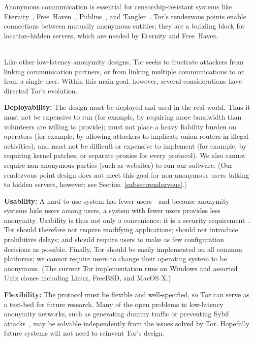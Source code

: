 \documentclass[times,10pt,twocolumn]{article}
\begin{document}
Anonymous communication is essential for censorship-resistant
systems like Eternity~\cite{eternity}, Free~Haven~\cite{freehaven-berk},
Publius~\cite{publius}, and Tangler~\cite{tangler}. Tor's rendezvous
points enable connections between mutually anonymous entities; they
are a building block for location-hidden servers, which are needed by
Eternity and Free~Haven.


\label{sec:assumptions}

\\
Like other low-latency anonymity designs, Tor seeks to frustrate
attackers from linking communication partners, or from linking
multiple communications to or from a single user.  Within this
main goal, however, several considerations have directed
Tor's evolution.

\textbf{Deployability:} The design must be deployed and used in the
real world.  Thus it
must not be expensive to run (for example, by requiring more bandwidth
than volunteers are willing to provide); must not place a heavy
liability burden on operators (for example, by allowing attackers to
implicate onion routers in illegal activities); and must not be
difficult or expensive to implement (for example, by requiring kernel
patches, or separate proxies for every protocol).  We also cannot
require non-anonymous parties (such as websites)
to run our software.  (Our rendezvous point design does not meet
this goal for non-anonymous users talking to hidden servers,
however; see Section~\ref{subsec:rendezvous}.)

\textbf{Usability:} A hard-to-use system has fewer users---and because
anonymity systems hide users among users, a system with fewer users
provides less anonymity.  Usability is thus not only a convenience:
it is a security requirement~\cite{econymics,back01}. Tor should
therefore not
require modifying applications; should not introduce prohibitive delays;
and should require users to make as few configuration decisions
as possible.  Finally, Tor should be easily implemented on all common
platforms; we cannot require users to change their operating system
to be anonymous.  (The current Tor implementation runs on Windows and
assorted Unix clones including Linux, FreeBSD, and MacOS X.)

\textbf{Flexibility:} The protocol must be flexible and well-specified,
so Tor can serve as a test-bed for future research.
Many of the open problems in low-latency anonymity
networks, such as generating dummy traffic or preventing Sybil
attacks~\cite{sybil}, may be solvable independently from the issues
solved by
Tor. Hopefully future systems will not need to reinvent Tor's design.
\end{document}
